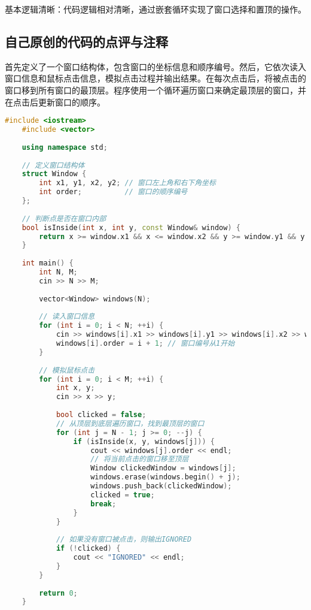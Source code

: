 基本逻辑清晰：代码逻辑相对清晰，通过嵌套循环实现了窗口选择和置顶的操作。

\subsection{自己原创的代码的点评与注释}

首先定义了一个窗口结构体，包含窗口的坐标信息和顺序编号。然后，它依次读入窗口信息和鼠标点击信息，模拟点击过程并输出结果。在每次点击后，将被点击的窗口移到所有窗口的最顶层。程序使用一个循环遍历窗口来确定最顶层的窗口，并在点击后更新窗口的顺序。

\begin{lstlisting}[language=C++]
    #include <iostream>
    #include <vector>
    
    using namespace std;
    
    // 定义窗口结构体
    struct Window {
        int x1, y1, x2, y2; // 窗口左上角和右下角坐标
        int order;          // 窗口的顺序编号
    };
    
    // 判断点是否在窗口内部
    bool isInside(int x, int y, const Window& window) {
        return x >= window.x1 && x <= window.x2 && y >= window.y1 && y <= window.y2;
    }
    
    int main() {
        int N, M;
        cin >> N >> M;
    
        vector<Window> windows(N);
    
        // 读入窗口信息
        for (int i = 0; i < N; ++i) {
            cin >> windows[i].x1 >> windows[i].y1 >> windows[i].x2 >> windows[i].y2;
            windows[i].order = i + 1; // 窗口编号从1开始
        }
    
        // 模拟鼠标点击
        for (int i = 0; i < M; ++i) {
            int x, y;
            cin >> x >> y;
    
            bool clicked = false;
            // 从顶层到底层遍历窗口，找到最顶层的窗口
            for (int j = N - 1; j >= 0; --j) {
                if (isInside(x, y, windows[j])) {
                    cout << windows[j].order << endl;
                    // 将当前点击的窗口移至顶层
                    Window clickedWindow = windows[j];
                    windows.erase(windows.begin() + j);
                    windows.push_back(clickedWindow);
                    clicked = true;
                    break;
                }
            }
    
            // 如果没有窗口被点击，则输出IGNORED
            if (!clicked) {
                cout << "IGNORED" << endl;
            }
        }
    
        return 0;
    }    
\end{lstlisting}

